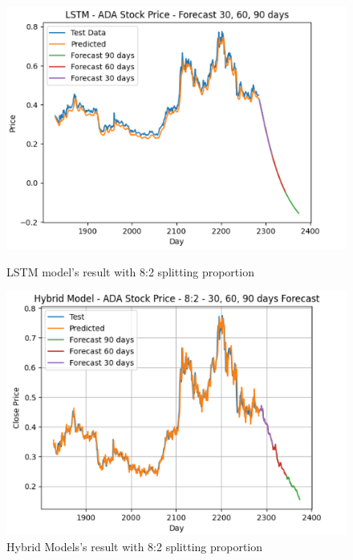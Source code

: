 \documentclass{ieeeojies}
\begin{document}
\begin{figure}[H]
    \centering
    \begin{minipage}{0.23\textwidth}
    \centering
    \includegraphics[width=1\textwidth]{bibliography/Figure/PREDICT/LSTM/LSTM-8-2-ADA.png}
    \caption{LSTM model's result with 8:2 splitting proportion}
    \label{fig10}
    \end{minipage}
    \hfill
    \begin{minipage}{0.23\textwidth}
    \centering
    \includegraphics[width=1\textwidth]{bibliography/Figure/PREDICT/HYBRID MODELS/HB-8-2-ADA.png}
    \caption{Hybrid Models's result with 8:2 splitting proportion}
    \label{fig11}
    \end{minipage}
\end{figure}
\end{document}
